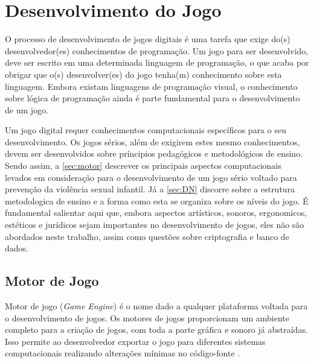 \chapter{Desenvolvimento do Jogo}\label{ch:Desenvolvimento}


O processo de desenvolvimento de jogos digitais é uma tarefa que exige do(s) desenvolvedor(es) conhecimentos de programação. Um jogo para ser desenvolvido, deve ser escrito em uma determinada linguagem de programação, o que acaba por obrigar que o(s) desenvolver(es) do jogo tenha(m) conhecimento sobre esta linguagem. Embora existam linguagens de programação visual, o conhecimento sobre lógica de programação ainda é parte fundamental para o desenvolvimento de um jogo. 


Um jogo digital requer conhecimentos computacionais específicos para o seu desenvolvimento. Os jogos sérios, além de exigirem estes mesmo conhecimentos, devem ser desenvolvidos sobre príncipios pedagógicos e metodológicos de ensino. Sendo assim, a \autoref{sec:motor} descrever os principais aspectos computacionais levados em consideração para o desenvolvimento de um jogo sério voltado para prevenção da violência sexual infantil. Já a \autoref{sec:DN} discorre sobre a estrutura metodologica de ensino e a forma como esta se organiza sobre os níveis do jogo. É fundamental salientar aqui que, embora aspectos artísticos, sonoros, ergonomicos, estéticos e jurídicos sejam importantes no desenvolvimento de jogos, eles não são abordados neste trabalho, assim como questões sobre criptografia e banco de dados.








\section{Motor de Jogo}\label{sec:motor}

Motor de jogo (\textit{Game Engine}) é o nome dado a qualquer plataforma voltada para o desenvolvimento de jogos. Os motores de jogos proporcionam um ambiente completo para a criação de jogos, com toda a parte gráfica e sonoro já abstraídas. Isso permite ao desenvolvedor exportar o jogo para diferentes sistemas computacionais realizando alterações mínimas no código-fonte \cite{bishop1998designing, machado2009serious}. 

